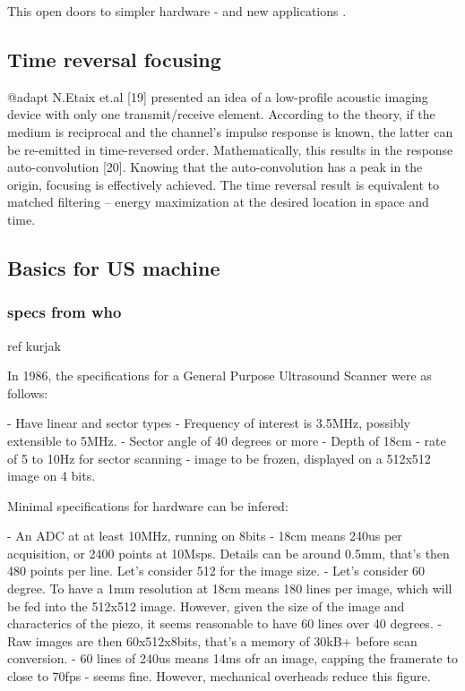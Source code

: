 \documentclass[conference]{IEEEtran}
\begin{document}
This open doors to simpler hardware - and new applications \cite{kruizinga_compressive_2017}.


\cite{hua_compressed_2011}

\subsection{Time reversal focusing}

@adapt N.Etaix et.al [19] presented an idea of a low-profile acoustic imaging device with only one transmit/receive element. According to the theory, if the medium is reciprocal and the channel’s impulse response is known, the latter can be re-emitted in time-reversed order. Mathematically, this results in the response auto-convolution [20]. Knowing that the auto-convolution has a peak in the origin, focusing is effectively achieved. The time reversal result is equivalent to matched filtering – energy maximization at the desired location in space and time.

\subsection{Basics for US machine}

\subsubsection{specs from who}


ref kurjak

In 1986, the specifications for a General Purpose Ultrasound Scanner were as follows:

- Have linear and sector types
- Frequency of interest is 3.5MHz, possibly extensible to 5MHz.
- Sector angle of 40 degrees or more
- Depth of 18cm
- rate of 5 to 10Hz for sector scanning
- image to be frozen, displayed on a 512x512 image on 4 bits.

Minimal specifications for hardware can be infered:

- An ADC at at least 10MHz, running on 8bits
- 18cm means 240us per acquisition, or 2400 points at 10Msps. Details can be around 0.5mm, that's then  480 points per line. Let's consider 512 for the image size.
- Let's consider 60 degree. To have a 1mm resolution at 18cm means 180 lines per image, which will be fed into the 512x512 image. However, given the size of the image and characterics of the piezo, it seems reasonable to have 60 lines over 40 degrees.
- Raw images are then 60x512x8bits, that's a memory of 30kB+ before scan conversion.
- 60 lines of 240us means 14ms ofr an image, capping the framerate to close to 70fps - seems fine. However, mechanical overheads reduce this figure.
\end{document}
